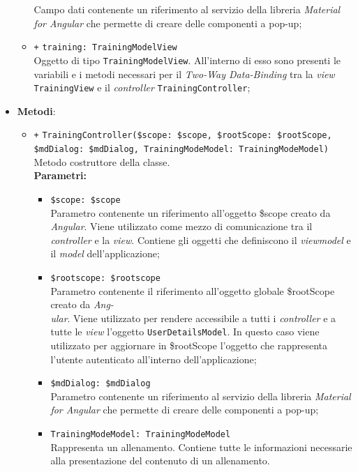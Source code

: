 \begin{itemize}
\begin{itemize}
		Campo dati contenente un riferimento al servizio della libreria \textit{Material for Angular} che permette di creare delle componenti a pop-up;
		\item \texttt{+} \texttt{training: TrainingModelView} \\
		Oggetto di tipo \texttt{TrainingModelView}. All'interno di esso sono presenti le variabili e i metodi necessari per il \textit{Two-Way Data-Binding} tra la \textit{view} \texttt{TrainingView} e il \textit{controller} \texttt{TrainingController};
	\end{itemize}
	\item \textbf{Metodi}:
	\begin{itemize}
		\item \texttt{+} \texttt{TrainingController(\$scope: \$scope, \$rootScope: \$rootScope, \$mdDialog: \$mdDialog, TrainingModeModel: TrainingModeModel)} \\ Metodo costruttore della classe. \\
		\textbf{Parametri:}
		\begin{itemize}
			\item \texttt{\$scope: \$scope} \\
			Parametro contenente un riferimento all'oggetto \$scope creato da \textit{Angular}. Viene utilizzato come mezzo di comunicazione tra il \textit{controller} e la \textit{view}. Contiene gli oggetti che definiscono il \textit{viewmodel} e il \textit{model} dell'applicazione;
			\item \texttt{\$rootscope: \$rootscope}\\
			Parametro contenente il riferimento all'oggetto globale \$rootScope creato da \textit{Ang-\\ular{}}. Viene utilizzato per rendere accessibile a tutti i \textit{controller} e a tutte le \textit{view} l'oggetto \texttt{UserDetailsModel}. In questo caso viene utilizzato per aggiornare in \$rootScope l'oggetto che rappresenta l'utente autenticato all'interno dell'applicazione;
			\item \texttt{\$mdDialog: \$mdDialog} \\
			Parametro contenente un riferimento al servizio della libreria \textit{Material for Angular} che permette di creare delle componenti a pop-up;
			\item \texttt{TrainingModeModel: TrainingModeModel} \\ Rappresenta un allenamento. Contiene tutte le informazioni necessarie alla presentazione del contenuto di un allenamento.

\end{itemize}
\end{itemize}
\end{itemize}

